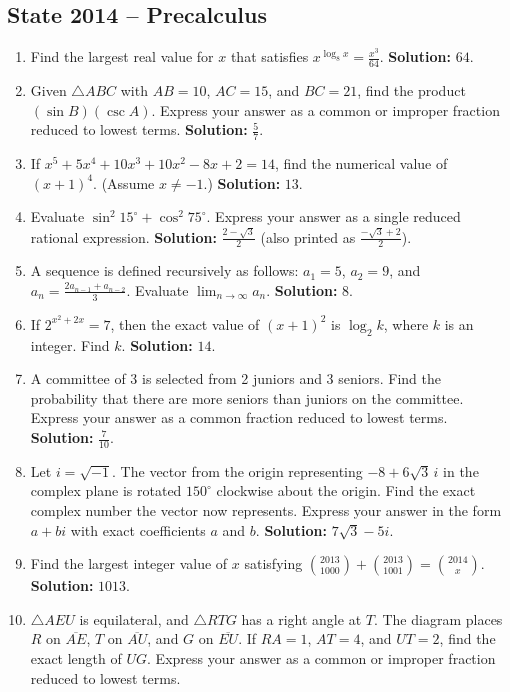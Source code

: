 \documentclass[10pt]{article}
\begin{document}
\subsection*{State 2014 -- Precalculus}
\begin{enumerate}
\item Find the largest real value for $x$ that satisfies $x^{\log_8 x}=\frac{x^3}{64}$. \textbf{Solution:} $64$.
\item Given $\triangle ABC$ with $AB=10$, $AC=15$, and $BC=21$, find the product $(\sin B)(\csc A)$. Express your answer as a common or improper fraction reduced to lowest terms. \textbf{Solution:} $\frac57$.
\item If $x^5+5x^4+10x^3+10x^2-8x+2=14$, find the numerical value of $(x+1)^4$. (Assume $x\ne -1$.) \textbf{Solution:} $13$.
\item Evaluate $\sin^2 15^\circ+\cos^2 75^\circ$. Express your answer as a single reduced rational expression. \textbf{Solution:} $\frac{2-\sqrt3}{2}$ (also printed as $\frac{-\sqrt3+2}{2}$).
\item A sequence is defined recursively as follows: $a_1=5$, $a_2=9$, and $a_n=\frac{2a_{n-1}+a_{n-2}}{3}$. Evaluate $\lim_{n\to\infty}a_n$. \textbf{Solution:} $8$.
\item If $2^{x^2+2x}=7$, then the exact value of $(x+1)^2$ is $\log_2 k$, where $k$ is an integer. Find $k$. \textbf{Solution:} $14$.
\item A committee of 3 is selected from 2 juniors and 3 seniors. Find the probability that there are more seniors than juniors on the committee. Express your answer as a common fraction reduced to lowest terms. \textbf{Solution:} $\frac{7}{10}$.
\item Let $i=\sqrt{-1}$. The vector from the origin representing $-8+6\sqrt3\,i$ in the complex plane is rotated $150^\circ$ clockwise about the origin. Find the exact complex number the vector now represents. Express your answer in the form $a+bi$ with exact coefficients $a$ and $b$. \textbf{Solution:} $7\sqrt3-5i$.
\item Find the largest integer value of $x$ satisfying $\binom{2013}{1000}+\binom{2013}{1001}=\binom{2014}{x}$. \textbf{Solution:} $1013$.
\item $\triangle AEU$ is equilateral, and $\triangle RTG$ has a right angle at $T$. The diagram places $R$ on $\overline{AE}$, $T$ on $\overline{AU}$, and $G$ on $\overline{EU}$. If $RA=1$, $AT=4$, and $UT=2$, find the exact length of $UG$. Express your answer as a common or improper fraction reduced to lowest terms. 

\end{enumerate}
\end{document}
